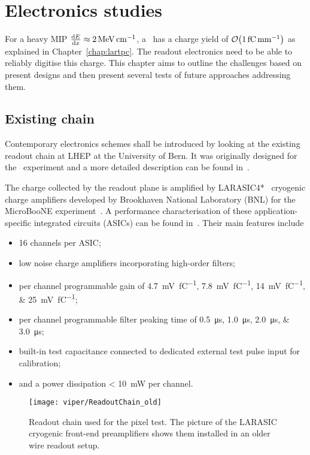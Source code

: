 \chapter{Electronics studies\label{chap:electronics}}
For a heavy MIP $\dv{E}{x} \approx \SI{2}{\mega\electronvolt\per\centi\metre}$, a \lartpc\ has a charge yield of $\order{\SI{1}{\femto\coulomb\per\milli\metre}}$ as explained in Chapter~\ref{chap:lartpc}.
The readout electronics need to be able to reliably digitise this charge.
This chapter aims to outline the challenges based on present designs and then present several tests of future approaches addressing them.


\section{Existing chain\label{sec:electronics_existing}}

Contemporary electronics schemes shall be introduced by looking at the existing readout chain at LHEP at the University of Bern.
It was originally designed for the \AT\ experiment and a more detailed description can be found in~\cite{AT_larasic}.

The charge collected by the readout plane is amplified by LARASIC4*~\cite{larasic} cryogenic charge amplifiers developed by Brookhaven National Laboratory (BNL) for the MicroBooNE experiment~\cite{uboone}.
A performance characterisation of these application-specific integrated circuits (ASICs) can be found in~\cite{AT_larasic}.
Their main features include

\begin{itemize}
	\item \num{16} channels per ASIC;
	\item low noise charge amplifiers incorporating high-order filters;
	\item per channel programmable gain of \SIlist[list-final-separator = { or }]{4.7; 7.8; 14; 25}{\milli\volt\per\femto\coulomb};
	\item per channel programmable filter peaking time of \SIlist[list-final-separator = { or }]{0.5; 1.0; 2.0; 3.0}{\micro\second};
	\item built-in test capacitance connected to dedicated external test pulse input for calibration;
	\item and a power dissipation \SI{< 10}{\milli\watt} per channel.
\end{itemize}

\begin{figure}[htb] %
	\centering
	\texttt{[image: viper/ReadoutChain\_old]}
	\caption{Readout chain used for the pixel test. The picture of the LARASIC cryogenic front-end preamplifiers shows them installed in an older wire readout setup.~\cite{AT_larasic}}
	\label{fig:viper_readoutChain_old}
\end{figure}

